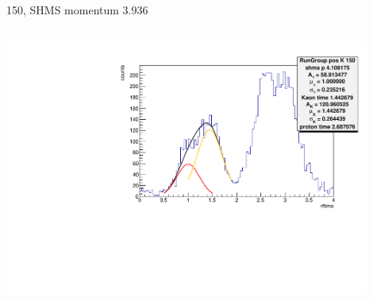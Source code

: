 \documentclass[aspectratio=169,xcolor=dvipsnames]{beamer}
\begin{document}
\begin{frame}{150, SHMS momentum 3.936}
\begin{columns}
\begin{column}[T]{0.33\textwidth}
\includegraphics[width = 0.9\textwidth]{results/pid/rftime/rftime_pos_150_5.pdf}
\end{column}
\end{columns}
\end{frame}
\end{document}
